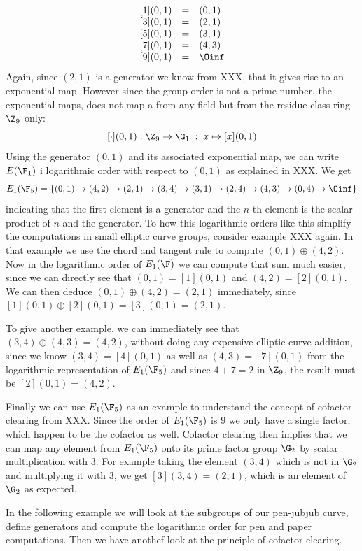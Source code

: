 \begin{example}
$$\begin{array}{lccr}
{}\begin{array}{lcl}
{}[1](0,1) &=& (0, 1) \\
{}[3](0,1) &=& (2, 1) \\
{}[5](0,1) &=& (3, 1) \\
{}[7](0,1) &=& (4, 3) \\
{}[9](0,1) &=& \Oinf
\end{array}
\end{array}
$$
Again, since $(2,1)$ is a generator we know from XXX, that it gives rise to an exponential map. However since the group order is not a prime number, the exponential maps, does not map a from any field but from the residue class ring $\Z_9$ only:
$$
[\cdot](0,1): \Z_9 \to \G_1\; : \; x\mapsto [x](0,1) 
$$
Using the generator $(0,1)$ and its associated exponential map, we can write $E(\F_1)$ i logarithmic order with respect to $(0,1)$ as explained in XXX. We get
$$
E_1(\F_5) = \{(0, 1)\to (4, 2)\to (2, 1)\to (3, 4)\to (3, 1)\to (2, 4)\to (4, 3)\to (0, 4)\to \Oinf \}
$$
indicating that the first element is a generator and the $n$-th element is the scalar product of $n$ and the generator. To how this logarithmic orders like this simplify the computations in small elliptic curve groups, consider example XXX again. In that example we use the chord and tangent rule to compute $(0,1)\oplus (4,2)$. Now in the logarithmic order of $E_1(\F)$ we can compute that sum much easier, since we can directly see that $(0,1)=[1](0,1)$ and $(4,2)=[2](0,1)$. We can then deduce $(0,1)\oplus (4,2)= (2,1)$ immediately, since $[1](0,1)\oplus [2](0,1)= [3](0,1)=(2,1)$.

To give another example, we can immediately see that $(3,4)\oplus (4,3) = (4,2)$, without doing any expensive elliptic curve addition, since we know $(3,4)= [4](0,1)$ as well as $(4,3)= [7](0,1)$ from the logarithmic representation of $E_1(\F_5)$ and since $4+7 = 2$ in $\Z_9$, the result must be $[2](0,1)=(4,2)$.

Finally we can use $E_1(\F_5)$ as an example to understand the concept of cofactor clearing from XXX. Since the order of $E_1(\F_5)$ is $9$ we only have a single factor, which happen to be the cofactor as well. Cofactor clearing then implies that we can map any element from $E_1(\F_5)$ onto its prime factor group $\G_2$ by scalar multiplication with $3$. For example taking the element $(3,4)$ which is not in $\G_2$ and multiplying it with $3$, we get $[3](3,4)= (2,1)$, which is an element of $\G_2$ as expected.
\end{example}
In the following example we will look at the subgroups of our pen-jubjub curve, define generators and compute the logarithmic order for pen and paper computations. Then we have anothef look at the principle of cofactor clearing.
